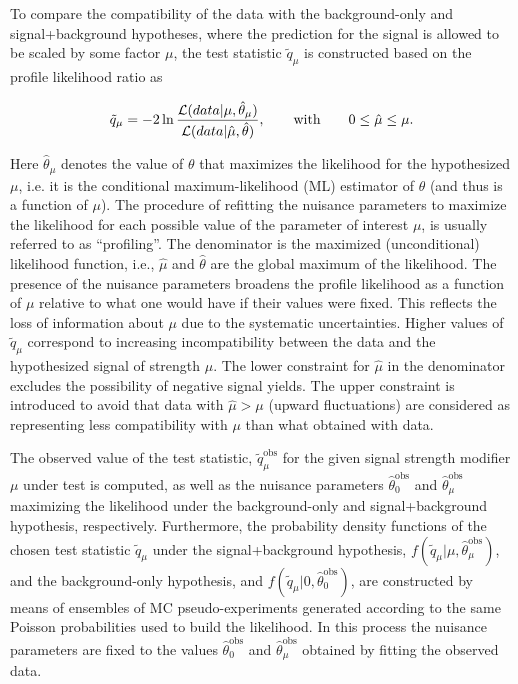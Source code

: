 To compare the compatibility of the data with the background-only and signal+background hypotheses, where the prediction for the signal is allowed to be scaled by some factor $\mu$,
the test statistic $\tilde{q}_\mu$ is constructed based on the profile likelihood ratio as

\begin{equation}\label{eqn:testStatistic}
\tilde{q}_\mu = -2\ln\frac{{\cal L}(data | \mu,\hat{\theta}_\mu)}{{\cal L}( data | \hat{\mu},\hat{\theta})},\qquad \mathrm{with} \qquad 0 \leq \hat{\mu} \leq \mu.
\end{equation}

Here $\hat{\theta}_\mu$ denotes the value of $\theta$ that maximizes the likelihood for the hypothesized $\mu$,
i.e. it is the conditional maximum-likelihood (ML) estimator of $\theta$ (and thus is a function of $\mu$). 
The procedure of refitting the nuisance parameters to maximize the likelihood for each possible value of the parameter of interest $\mu$, is usually referred to as ``profiling''.
The denominator is the maximized (unconditional) likelihood function, i.e., $\hat{\mu}$ and $\hat{\theta}$ are the global maximum of the likelihood.
The presence of the nuisance parameters broadens the profile likelihood as a function of $\mu$ relative to what one would have if their values were fixed.
This reflects the loss of information about $\mu$ due to the systematic uncertainties.
Higher values of $\tilde{q}_\mu$ correspond to increasing incompatibility between the data and the hypothesized signal of strength $\mu$.
The lower constraint for $\hat{\mu}$ in the denominator excludes the possibility of negative signal yields. 
The upper constraint is introduced to avoid that data with $\hat{\mu} > \mu$ (upward fluctuations) are considered as representing less compatibility with $\mu$ than what obtained with data.

The observed value of the test statistic, $\tilde{q}_\mu^\mathrm{obs}$ for the given signal strength modifier $\mu$ under test is computed,
as well as the nuisance parameters $\hat{\theta}_0^\mathrm{obs}$ and $\hat{\theta}_\mu^\mathrm{obs}$ maximizing the likelihood under the background-only and signal+background hypothesis, respectively.
Furthermore, the probability density functions of the chosen test statistic $\tilde{q}_\mu$ under the signal+background hypothesis, $f(\tilde{q}_\mu|\mu,\hat{\theta}_\mu^\mathrm{obs})$,
and the background-only hypothesis, and $f(\tilde{q}_\mu|0,\hat{\theta}_0^\mathrm{obs})$, are constructed by means of ensembles of MC pseudo-experiments
generated according to the same Poisson probabilities used to build the likelihood. In this process the nuisance parameters 
are fixed to the values $\hat{\theta}_0^\mathrm{obs}$ and $\hat{\theta}_\mu^\mathrm{obs}$ obtained by fitting the observed data.

